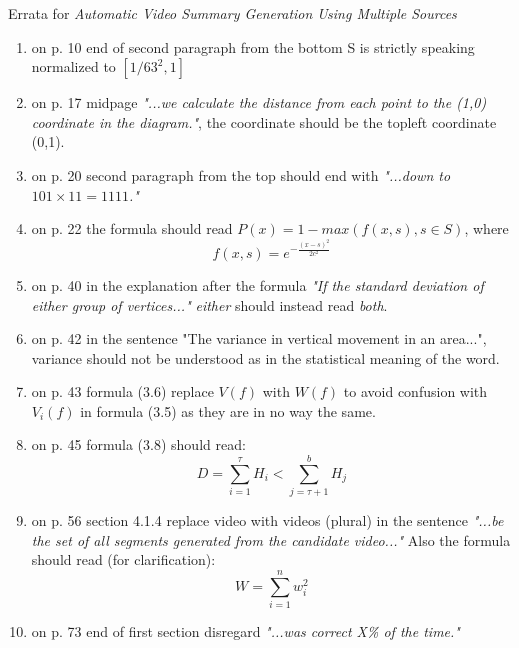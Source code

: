 \documentclass[12pt]{report}
\begin{document}
%
\noindent
\centering
\large Errata for \textit{Automatic Video Summary Generation Using Multiple Sources}\normalsize
\begin{enumerate}
%
\item on p. 10 end of second paragraph from the bottom S is strictly speaking normalized to $[1/63^2,1]$
%
\item on p. 17 midpage \textit{"...we calculate the distance from each point to the (1,0) coordinate in the diagram."}, the coordinate should be the topleft coordinate (0,1).
%
\item on p. 20 second paragraph from the top should end with \textit{"...down to $101 \times 11 = 1111$."}
%
\item on p. 22 the formula should read $P(x) = 1 - max(f(x,s), s \in S)$, where 
\[
f(x,s)=e^{-\frac{(x-s)^{2}}{2c^{2}}}
\]
%
\item on p. 40 in the explanation after the formula \textit{"If the standard deviation of either group of vertices..."} \textit{either} should instead read \textit{both}.
%
\item on p. 42 in the sentence "The variance in vertical movement in an area...", variance should not be understood as in the statistical meaning of the word.
%
\item on p. 43 formula (3.6) replace $V(f)$ with $W(f)$ to avoid confusion with $V_i(f)$ in formula (3.5) as they are in no way the same.
%
\item on p. 45 formula (3.8) should read:
\[
D=\sum_{i=1}^{\tau}H_i < \sum_{j=\tau+1}^{b}H_j
\]
%
\item on p. 56 section 4.1.4 replace video with videos (plural) in the sentence \textit{"...be the set of all segments generated from the candidate video..."}
Also the formula should read (for clarification):
\[
W = \sum_{i=1}^n w_i^2
\]
%
\item on p. 73 end of first section disregard \textit{"...was correct X\% of the time."}
%
\end{enumerate}
%
\end{document}
